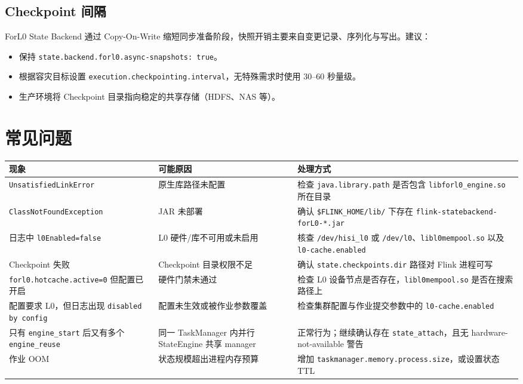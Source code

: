 \documentclass[a4paper,11pt]{article}
\newcommand{\project}{ForL0 State Backend}
\newcommand{\cfg}[1]{\nolinkurl{#1}}
\begin{document}
\subsection{Checkpoint 间隔}

\project{} 通过 Copy-On-Write 缩短同步准备阶段，快照开销主要来自变更记录、序列化与写出。建议：

\begin{itemize}
  \item 保持 \texttt{state.backend.forl0.async-snapshots: true}。
  \item 根据容灾目标设置 \texttt{execution.checkpointing.interval}，无特殊需求时使用 30--60 秒量级。
  \item 生产环境将 Checkpoint 目录指向稳定的共享存储（HDFS、NAS 等）。
\end{itemize}

\section{常见问题}

\begin{table}[H]
\centering
\small
\begin{tabularx}{\textwidth}{L{4.8cm} L{3.4cm} X}
\toprule
\textbf{现象} & \textbf{可能原因} & \textbf{处理方式} \\
\midrule
\texttt{UnsatisfiedLinkError} & 原生库路径未配置 & 检查 \texttt{java.library.path} 是否包含 \texttt{libforl0\_engine.so} 所在目录 \\
\texttt{ClassNotFoundException} & JAR 未部署 & 确认 \texttt{\$FLINK\_HOME/lib/} 下存在 \cfg{flink-statebackend-forL0-*.jar} \\
日志中 \texttt{l0Enabled=false} & L0 硬件/库不可用或未启用 & 核查 \texttt{/dev/hisi\_l0} 或 \texttt{/dev/l0}、\texttt{libl0mempool.so} 以及 \texttt{l0-cache.enabled} \\
Checkpoint 失败 & Checkpoint 目录权限不足 & 确认 \texttt{state.checkpoints.dir} 路径对 Flink 进程可写 \\
\cfg{forl0.hotcache.active=0} 但配置已开启 & 硬件门禁未通过 & 检查 L0 设备节点是否存在，\texttt{libl0mempool.so} 是否在搜索路径上 \\
配置要求 L0，但日志出现 \texttt{disabled by config} & 配置未生效或被作业参数覆盖 & 检查集群配置与作业提交参数中的 \texttt{l0-cache.enabled} \\
只有 \texttt{engine\_start} 后又有多个 \texttt{engine\_reuse} & 同一 TaskManager 内并行 StateEngine 共享 manager & 正常行为；继续确认存在 \texttt{state\_attach}，且无 hardware-not-available 警告 \\
作业 OOM & 状态规模超出进程内存预算 & 增加 \cfg{taskmanager.memory.process.size}，或设置状态 TTL \\
\bottomrule
\end{tabularx}
\end{table}
\end{document}
